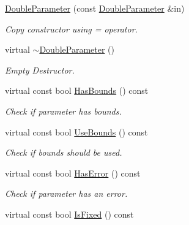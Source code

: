 \begin{DoxyCompactItemize}
\hyperlink{class_double_parameter_a4e1e25b484a796605b16a094ea8cf4b3}{Double\-Parameter} (const \hyperlink{class_double_parameter}{Double\-Parameter} \&in)
\begin{DoxyCompactList}\small\item\em Copy constructor using = operator. \end{DoxyCompactList}\item 
virtual \hyperlink{class_double_parameter_ac86e8a2dc149bc9465e88ded618e2e7f}{$\sim$\-Double\-Parameter} ()
\begin{DoxyCompactList}\small\item\em Empty Destructor. \end{DoxyCompactList}\item 
\hypertarget{class_double_parameter_ac7f7e9985fe1d3fad443fa11c1fbe39a}{virtual const bool \hyperlink{class_double_parameter_ac7f7e9985fe1d3fad443fa11c1fbe39a}{Has\-Bounds} () const }\label{class_double_parameter_ac7f7e9985fe1d3fad443fa11c1fbe39a}

\begin{DoxyCompactList}\small\item\em Check if parameter has bounds. \end{DoxyCompactList}\item 
\hypertarget{class_double_parameter_a270b26b7cbe645520028ad5bf0c2e316}{virtual const bool \hyperlink{class_double_parameter_a270b26b7cbe645520028ad5bf0c2e316}{Use\-Bounds} () const }\label{class_double_parameter_a270b26b7cbe645520028ad5bf0c2e316}

\begin{DoxyCompactList}\small\item\em Check if bounds should be used. \end{DoxyCompactList}\item 
\hypertarget{class_double_parameter_ab8787514bea257bb4f94bff05c3599ee}{virtual const bool \hyperlink{class_double_parameter_ab8787514bea257bb4f94bff05c3599ee}{Has\-Error} () const }\label{class_double_parameter_ab8787514bea257bb4f94bff05c3599ee}

\begin{DoxyCompactList}\small\item\em Check if parameter has an error. \end{DoxyCompactList}\item 
\hypertarget{class_double_parameter_afb30d7172e0f30563624720fec51108a}{virtual const bool \hyperlink{class_double_parameter_afb30d7172e0f30563624720fec51108a}{Is\-Fixed} () const }\label{class_double_parameter_afb30d7172e0f30563624720fec51108a}


\end{DoxyCompactItemize}
